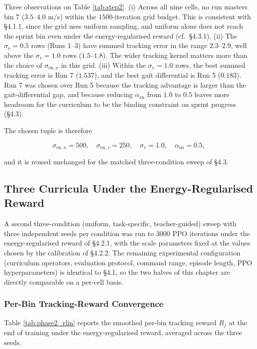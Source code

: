 Three observations on Table \ref{tab:step2}. (i) Across all nine cells, no run masters bin 7 ($3.5$--$4.0$ m/s) within the $1500$-iteration grid budget. This is consistent with \S4.1.1, since the grid uses uniform sampling, and uniform alone does not reach the sprint bin even under the energy-regularised reward (cf.\ \S4.3.1). (ii) The $\sigma_v = 0.5$ rows (Runs 1--3) have summed tracking error in the range $2.3$--$2.9$, well above the $\sigma_v = 1.0$ rows ($1.5$--$1.8$). The wider tracking kernel matters more than the choice of $\sigma_{\mathrm{en},x}$ in this grid. (iii) Within the $\sigma_v = 1.0$ rows, the best summed tracking error is Run 7 ($1.537$), and the best gait differential is Run 5 ($0.183$). Run 7 was chosen over Run 5 because the tracking advantage is larger than the gait-differential gap, and because reducing $\alpha_{\mathrm{en}}$ from $1.0$ to $0.5$ leaves more headroom for the curriculum to be the binding constraint on sprint progress (\S4.3).

The chosen tuple is therefore

\[
\sigma_{\mathrm{en},x} = 500, \quad \sigma_{\mathrm{en},z} = 250, \quad \sigma_v = 1.0, \quad \alpha_{\mathrm{en}} = 0.5,
\]

and it is reused unchanged for the matched three-condition sweep of \S4.3.

\subsection{Three Curricula Under the Energy-Regularised Reward}

A second three-condition (uniform, task-specific, teacher-guided) sweep with three independent seeds per condition was run to $3000$ PPO iterations under the energy-regularised reward of \S4.2.1, with the scale parameters fixed at the values chosen by the calibration of \S4.2.2. The remaining experimental configuration (curriculum operators, evaluation protocol, command range, episode length, PPO hyperparameters) is identical to \S4.1, so the two halves of this chapter are directly comparable on a per-cell basis.

\subsubsection{Per-Bin Tracking-Reward Convergence}

Table \ref{tab:phase2_rlin} reports the smoothed per-bin tracking reward $R_j$ at the end of training under the energy-regularised reward, averaged across the three seeds.

